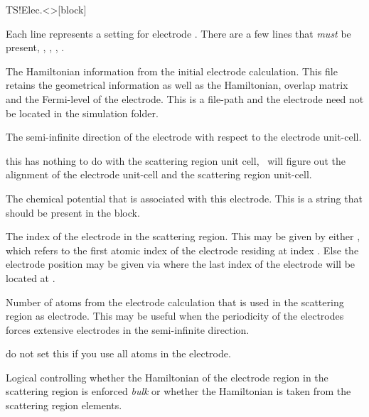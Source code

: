 \begin{fdfentry}{TS!Elec.<>}[block]

  Each line represents a setting for electrode \fdf*{<>}.
  There are a few lines that \emph{must} be present, ,
  , , .

  \begin{fdfoptions}

    \option[HS]%
    The Hamiltonian information from the initial electrode
    calculation. This file retains the geometrical information as well
    as the Hamiltonian, overlap matrix and the Fermi-level of the
    electrode. 
    This is a file-path and the electrode  need not be
    located in the simulation folder.

    The semi-infinite direction of the electrode with respect to the
    electrode unit-cell. 

    \note this has nothing to do with the scattering region unit cell,
    \tsiesta\ will figure out the alignment of the electrode unit-cell
    and the scattering region unit-cell.

    The chemical potential that is associated with this
    electrode. This is a string that should be present in the
     block.

    The index of the electrode in the scattering region.
    This may be given by either , which refers to
    the first atomic index of the electrode residing at index
    . Else the electrode position may be given via
     where the last index of the electrode
    will be located at .

    Number of atoms from the electrode calculation that is used in the
    scattering region as electrode. This may be useful when the
    periodicity of the electrodes forces extensive electrodes in the
    semi-infinite direction.

    \note do not set this if you use all atoms in the electrode.

    \option[Bulk]%
    Logical controlling whether the Hamiltonian of the electrode
    region in the scattering region is enforced \emph{bulk} or whether
    the Hamiltonian is taken from the scattering region elements.


\end{fdfoptions}
\end{fdfentry}

